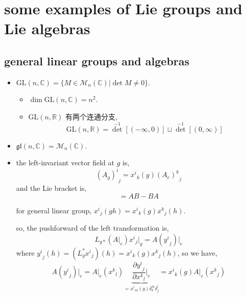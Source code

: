 \chapter{some examples of Lie groups and Lie algebras}
\section{general linear groups and algebras}
\begin{itemize}
	\item $\mathrm{GL}(n, \mathbb{C}) = \{M \in \mathcal{M}_n(\mathbb{C}) | \det M \neq 0\}$.
	\begin{itemize}
		\item $\dim \mathrm{GL}(n, \mathbb{C}) = n^2$.
		
		\item $\mathrm{GL}(n, \mathbb{R})$ 有两个连通分支,
		\begin{equation}
			\mathrm{GL}(n, \mathbb{R}) = {\det}^{- 1}[(- \infty, 0)] \sqcup {\det}^{- 1}[(0, \infty)]
		\end{equation}
	\end{itemize}
	
	\item $\mathfrak{gl}(n, \mathbb{C}) = \mathcal{M}_n(\mathbb{C})$.
	
	\item the left-invariant vector field at $g$ is,
	\begin{equation}
		{(A_g)^i}_j = {x^i}_k(g) {(A_e)^k}_j
	\end{equation}
	and the Lie bracket is,
	\begin{equation}
		[A, B] = A B - B A
	\end{equation}
	
	\begin{tcolorbox}[title=proof:]
		for general linear group, ${x^i}_j(g h) = {x^i}_k(g) {x^k}_j(h)$.
		
		so, the pushforward of the left transformation is,
		\begin{equation}
			L_{g *} (A \Big|_e) {x^i}_j \Big|_g = A({y^i}_j) \Big|_e
		\end{equation}
		where ${y^i}_j(h) = (L_g^* {x^i}_j)(h) = {x^i}_k(g) {x^k}_j(h)$, so we have,
		\begin{equation}
			A({y^i}_j) \Big|_e = A \Big|_e ({x^k}_l) \underbrace{\frac{\partial {y^i}_j}{\partial {x^k}_l} \Big|_e}_{= {x^i}_m(g) \delta^m_k \delta^l_j} = {x^i}_k(g) A \Big|_e ({x^k}_j)
		\end{equation}
		

\end{tcolorbox}
\end{itemize}
